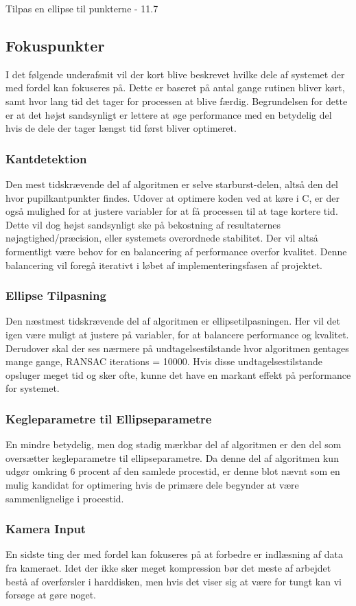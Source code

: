 \documentclass[analyse.tex]{subfiles}
\begin{document}
Tilpas en ellipse til punkterne - 11.7%

\subsection{Fokuspunkter}
I det følgende underafsnit vil der kort blive beskrevet hvilke dele af systemet der med fordel kan fokuseres på. Dette er baseret på antal gange rutinen bliver kørt, samt hvor lang tid det tager for processen at blive færdig. Begrundelsen for dette er at det højst sandsynligt er lettere at øge performance med en betydelig del hvis de dele der tager længst tid først bliver optimeret.

\subsubsection{Kantdetektion}
Den mest tidskrævende del af algoritmen er selve starburst-delen, altså den del hvor pupilkantpunkter findes. Udover at optimere koden ved at køre i C, er der også mulighed for at justere variabler for at få processen til at tage kortere tid. Dette vil dog højst sandsynligt ske på bekostning af resultaternes nøjagtighed/præcision, eller systemets overordnede stabilitet. Der vil altså formentligt være behov for en balancering af performance overfor kvalitet. Denne balancering vil foregå iterativt i løbet af implementeringsfasen af projektet.

\subsubsection{Ellipse Tilpasning}
Den næstmest tidskrævende del af algoritmen er ellipsetilpasningen. Her vil det igen være muligt at justere på variabler, for at balancere performance og kvalitet. Derudover skal der ses nærmere på undtagelsestilstande hvor algoritmen gentages mange gange, RANSAC iterations = 10000. Hvis disse undtagelsestilstande opsluger meget tid og sker ofte, kunne det have en markant effekt på performance for systemet.

\subsubsection{Kegleparametre til Ellipseparametre}
En mindre betydelig, men dog stadig mærkbar del af algoritmen er den del som oversætter kegleparametre til ellipseparametre. Da denne del af algoritmen kun udgør omkring 6 procent af den samlede procestid, er denne blot nævnt som en mulig kandidat for optimering hvis de primære dele begynder at være sammenlignelige i procestid. 

\subsubsection{Kamera Input}
En sidste ting der med fordel kan fokuseres på at forbedre er indlæsning af data fra kameraet. Idet der ikke sker meget kompression bør det meste af arbejdet bestå af overførsler i harddisken, men hvis det viser sig at være for tungt kan vi forsøge at gøre noget.
\end{document}
